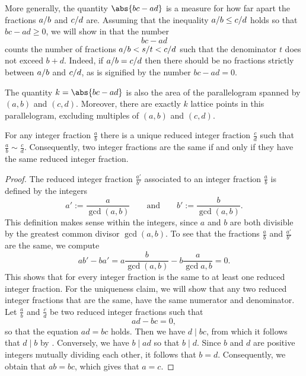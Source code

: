 \begin{remark}
More generally, the quantity $\abs{bc-ad}$ is a measure for how far apart the fractions $a/b$ and $c/d$ are. Assuming that the inequality $a/b\leq c/d$ holds so that $bc-ad\geq 0$, we will show in  that the number
\begin{equation*}
  bc-ad
\end{equation*}
counts the number of fractions $a/b<s/t<c/d$ such that the denominator $t$ does not exceed $b+d$. Indeed, if $a/b=c/d$ then there should be no fractions strictly between $a/b$ and $c/d$, as is signified by the number $bc-ad=0$.

The quantity $k=\abs{bc-ad}$ is also the area of the parallelogram spanned by $(a,b)$ and $(c,d)$. Moreover, there are exactly $k$ lattice points in this parallelogram, excluding multiples of $(a,b)$ and $(c,d)$.
\end{remark}

\begin{theorem}
  For any integer fraction $\frac{a}{b}$ there is a unique reduced integer fraction $\frac{c}{d}$ such that $\frac{a}{b}\sim\frac{c}{d}$. Consequently, two integer fractions are the same if and only if they have the same reduced integer fraction.
\end{theorem}

\begin{proof}
  The reduced integer fraction $\frac{a'}{b'}$ associated to an integer fraction $\frac{a}{b}$ is defined by the integers
  \begin{equation*}
    a':=\frac{a}{\gcd(a,b)}\qquad\text{and}\qquad b':=\frac{b}{\gcd(a,b)}.
  \end{equation*}
  This definition makes sense within the integers, since $a$ and $b$ are both divisible by the greatest common divisor $\gcd(a,b)$. To see that the fractions $\frac{a}{b}$ and $\frac{a'}{b'}$ are the same, we compute
  \begin{equation*}
    ab'-ba'=a\frac{b}{\gcd(a,b)}-b\frac{a}{\gcd{a,b}}=0.
  \end{equation*}
  This shows that for every integer fraction is the same to at least one reduced integer fraction. For the uniqueness claim, we will show that any two reduced integer fractions that are the same, have the same numerator and denominator. Let $\frac{a}{b}$ and $\frac{c}{d}$ be two reduced integer fractions such that
  \begin{equation*}
    ad-bc=0,
  \end{equation*}
  so that the equation $ad=bc$ holds. Then we have $d\mid bc$, from which it follows that $d\mid b$ by . Conversely, we have $b\mid ad$ so that $b\mid d$. Since $b$ and $d$ are positive integers mutually dividing each other, it follows that $b=d$. Consequently, we obtain that $ab=bc$, which gives that $a=c$.
\end{proof}

